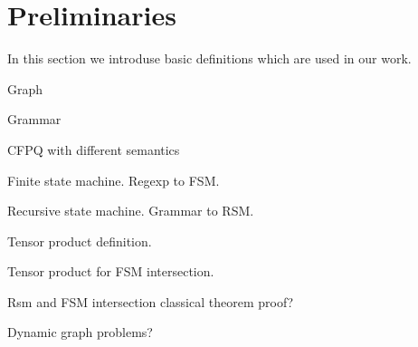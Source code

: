 \section{Preliminaries}

In this section we introduse basic definitions which are used in our work.

Graph

Grammar

CFPQ with different semantics

Finite state machine. Regexp to FSM.

Recursive state machine. Grammar to RSM.

Tensor product definition.

Tensor product for FSM intersection.

Rsm and FSM intersection classical theorem proof?

Dynamic graph problems? 